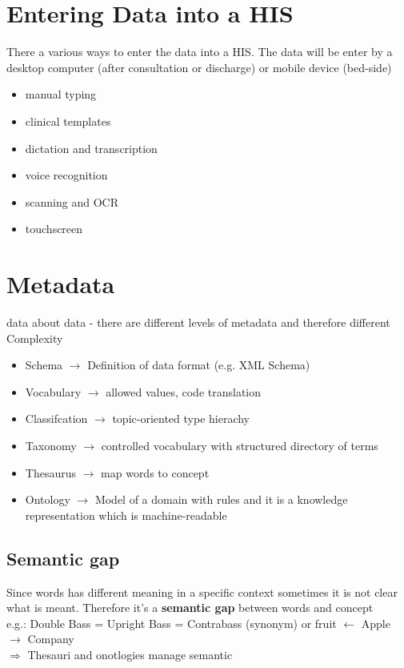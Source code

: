 \documentclass{report}
\theoremstyle{definition}
\theoremstyle{example}
\begin{document}
\section{Entering Data into a HIS}
There a various ways to enter the data into a HIS. The data will be enter by a desktop computer (after consultation or discharge) or mobile device (bed-side)
\begin{itemize}
   \item manual typing
   \item clinical templates
   \item dictation and transcription
   \item voice recognition
   \item scanning and OCR
   \item touchscreen
\end{itemize}

\section{Metadata}
data about data - there are different levels of metadata and therefore different Complexity
\begin{itemize}
   \item Schema $\rightarrow$ Definition of data format (e.g. XML Schema)
   \item Vocabulary $\rightarrow$ allowed values, code translation
   \item Classifcation $\rightarrow$ topic-oriented type hierachy
   \item Taxonomy $\rightarrow$ controlled vocabulary with structured directory of terms
   \item Thesaurus $\rightarrow$  map words to concept
   \item Ontology $\rightarrow$ Model of a domain with rules and it is a knowledge representation which is machine-readable 
\end{itemize}

\subsection{Semantic gap}
Since words has different meaning in a specific context sometimes it is not clear what is meant. Therefore it's a \textbf{semantic gap} between words and concept\\
e.g.: Double Bass = Upright Bass = Contrabass (synonym) or  fruit $\leftarrow$ Apple $\rightarrow$ Company\\
$\Rightarrow$ Thesauri and onotlogies manage semantic
\end{document}
